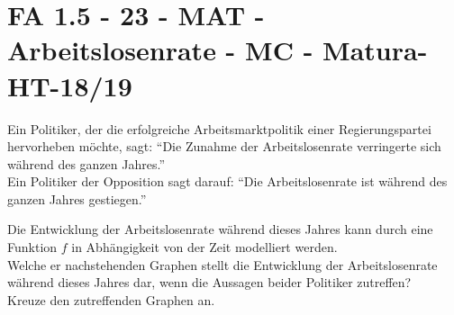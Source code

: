 \section{FA 1.5 - 23 - MAT - Arbeitslosenrate - MC - Matura-HT-18/19}

\begin{beispiel}[FA 1.5]{1}
Ein Politiker, der die erfolgreiche Arbeitsmarktpolitik einer Regierungspartei hervorheben möchte, sagt: "`Die Zunahme der Arbeitslosenrate verringerte sich während des ganzen Jahres."'\\
Ein Politiker der Opposition sagt darauf: "`Die Arbeitslosenrate ist während des ganzen Jahres gestiegen."'

Die Entwicklung der Arbeitslosenrate während dieses Jahres kann durch eine Funktion $f$ in Abhängigkeit von der Zeit modelliert werden.\\
Welche er nachstehenden Graphen stellt die Entwicklung der Arbeitslosenrate während dieses Jahres dar, wenn die Aussagen beider Politiker zutreffen?\\
Kreuze den zutreffenden Graphen an.


\end{beispiel}
